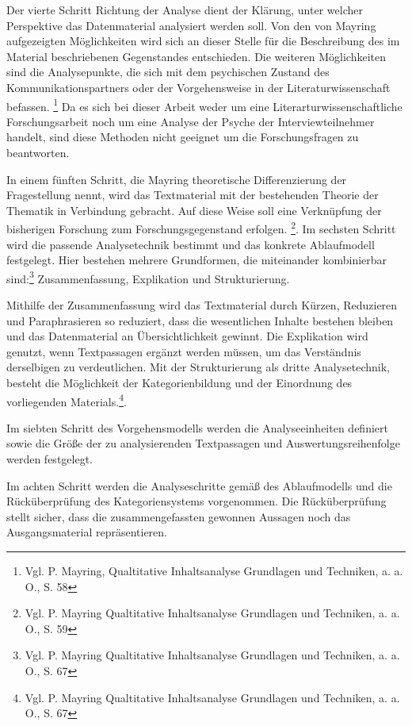Der vierte Schritt Richtung der Analyse dient der Klärung, unter welcher Perspektive das Datenmaterial analysiert werden soll. Von den von Mayring aufgezeigten Möglichkeiten wird sich an dieser Stelle für die Beschreibung des im Material beschriebenen Gegenstandes entschieden. Die weiteren Möglichkeiten sind die Analysepunkte, die sich mit dem psychischen Zustand des Kommunikationspartners oder der Vorgehensweise in der Literaturwissenschaft befassen. \footnote {Vgl. P. Mayring, Qualtitative Inhaltsanalyse Grundlagen und Techniken, a. a. O., S. 58} Da es sich bei dieser Arbeit weder um eine Literarturwissenschaftliche Forschungsarbeit noch um eine Analyse der Psyche der Interviewteilnehmer handelt, sind diese Methoden nicht geeignet um die Forschungsfragen zu beantworten. 

In einem fünften Schritt, die Mayring theoretische Differenzierung der Fragestellung nennt, wird das Textmaterial mit der bestehenden Theorie der Thematik in Verbindung gebracht. Auf diese Weise soll eine Verknüpfung der bisherigen Forschung zum Forschungsgegenstand erfolgen. \footnote {Vgl. P. Mayring Qualtitative Inhaltsanalyse Grundlagen und Techniken, a. a. O., S. 59}. 
Im sechsten Schritt wird die passende Analysetechnik bestimmt und das konkrete Ablaufmodell festgelegt. Hier bestehen mehrere Grundformen, die miteinander kombinierbar sind:\footnote {Vgl. P. Mayring Qualtitative Inhaltsanalyse Grundlagen und Techniken, a. a. O., S. 67} Zusammenfassung, Explikation und Strukturierung. 

Mithilfe der Zusammenfassung wird das Textmaterial durch Kürzen, Reduzieren und Paraphrasieren so reduziert, dass die wesentlichen Inhalte bestehen bleiben und das Datenmaterial an Übersichtlichkeit gewinnt. Die Explikation wird genutzt, wenn Textpassagen ergänzt werden müssen, um das Verständnis derselbigen zu verdeutlichen. Mit der Strukturierung als dritte Analysetechnik, besteht die Möglichkeit der Kategorienbildung und der Einordnung des vorliegenden Materials.\footnote {Vgl. P. Mayring Qualtitative Inhaltsanalyse Grundlagen und Techniken, a. a. O., S. 67}.

Im siebten Schritt des Vorgehensmodells werden die Analyseeinheiten definiert sowie die Größe der zu analysierenden Textpassagen und Auswertungsreihenfolge werden festgelegt. 

Im achten Schritt werden die Analyseschritte gemäß des Ablaufmodells und die Rücküberprüfung des Kategoriensystems vorgenommen. Die Rücküberprüfung stellt sicher, dass die zusammengefassten gewonnen Aussagen noch das Ausgangsmaterial repräsentieren. 

